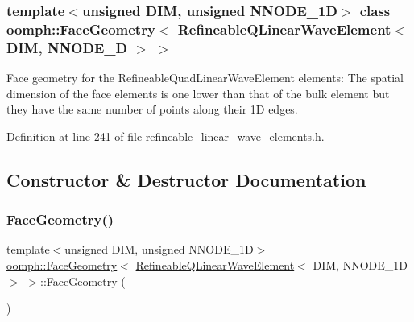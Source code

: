 \subsubsection*{template$<$unsigned D\+IM, unsigned N\+N\+O\+D\+E\+\_\+1D$>$\newline
class oomph\+::\+Face\+Geometry$<$ Refineable\+Q\+Linear\+Wave\+Element$<$ D\+I\+M, N\+N\+O\+D\+E\+\_\+D $>$ $>$}

Face geometry for the Refineable\+Quad\+Linear\+Wave\+Element elements\+: The spatial dimension of the face elements is one lower than that of the bulk element but they have the same number of points along their 1D edges. 

Definition at line 241 of file refineable\+\_\+linear\+\_\+wave\+\_\+elements.\+h.



\subsection{Constructor \& Destructor Documentation}
\mbox{\label{classoomph_1_1FaceGeometry_3_01RefineableQLinearWaveElement_3_01DIM_00_01NNODE__1D_01_4_01_4_a9c61cb68c89cac6d287de2c68df1e1d3}} 
\subsubsection{\texorpdfstring{Face\+Geometry()}{FaceGeometry()}}
{\footnotesize\ttfamily template$<$unsigned D\+IM, unsigned N\+N\+O\+D\+E\+\_\+1D$>$ \\
\hyperlink{classoomph_1_1FaceGeometry}{oomph\+::\+Face\+Geometry}$<$ \hyperlink{classoomph_1_1RefineableQLinearWaveElement}{Refineable\+Q\+Linear\+Wave\+Element}$<$ D\+IM, N\+N\+O\+D\+E\+\_\+1D $>$ $>$\+::\hyperlink{classoomph_1_1FaceGeometry}{Face\+Geometry} (\begin{DoxyParamCaption}{ }\end{DoxyParamCaption})\hspace{0.3cm}{\ttfamily [inline]}}



